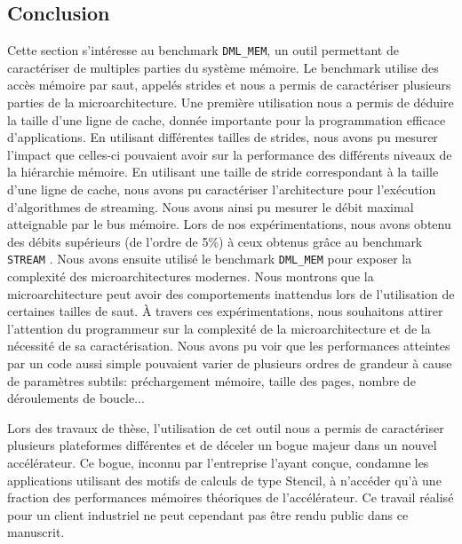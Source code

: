     
    

\subsection{Conclusion}

    Cette section s'intéresse au benchmark \verb=DML_MEM=, un outil permettant de caractériser de multiples parties du système mémoire. Le benchmark utilise des accès mémoire par saut, appelés \glspl{stride} et nous a permis de caractériser plusieurs parties de la microarchitecture. Une première utilisation nous a permis de déduire la taille d'une ligne de cache, donnée importante pour la programmation efficace d'applications. En utilisant différentes tailles de strides, nous avons pu mesurer l'impact que celles-ci pouvaient avoir sur la performance des différents niveaux de la hiérarchie mémoire. En utilisant une taille de stride correspondant à la taille d'une ligne de cache, nous avons pu caractériser l'architecture pour l'exécution d'algorithmes de streaming. Nous avons ainsi pu mesurer le débit maximal atteignable par le bus mémoire. Lors de nos expérimentations, nous avons obtenu des débits supérieurs (de l'ordre de 5\%) à ceux obtenus grâce au benchmark \verb|STREAM| \cite{McCalpin1995}. Nous avons ensuite utilisé le benchmark \verb=DML_MEM= pour exposer la complexité des microarchitectures modernes. Nous montrons que la microarchitecture peut avoir des comportements inattendus lors de l'utilisation de certaines tailles de saut. À travers ces expérimentations, nous souhaitons attirer l'attention du programmeur sur la complexité de la microarchitecture et de la nécessité de sa caractérisation. Nous avons pu voir que les performances atteintes par un code aussi simple pouvaient varier de plusieurs ordres de grandeur à cause de paramètres subtils: préchargement mémoire, taille des pages, nombre de déroulements de boucle...
    
    
    Lors des travaux de thèse, l'utilisation de cet outil nous a permis de caractériser plusieurs plateformes différentes et de déceler un bogue majeur dans un nouvel accélérateur. Ce bogue, inconnu par l'entreprise l'ayant conçue, condamne les applications utilisant des motifs de calculs de type Stencil, à n'accéder qu'à une fraction des performances mémoires théoriques de l'accélérateur. Ce travail réalisé pour un client industriel ne peut cependant pas être rendu public dans ce manuscrit.